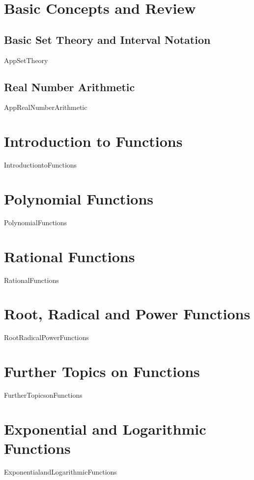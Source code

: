 \documentclass[11pt]{book}
\theoremstyle{definition}  %
\begin{document}
\renewcommand{\chaptername}{Chapter}

\chapter{Basic Concepts and Review}
\thispagestyle{empty}
\section{Basic Set Theory and Interval Notation}
{AppSetTheory}
\newpage
\section{Real Number Arithmetic}
{AppRealNumberArithmetic}

\chapter{Introduction to Functions}
\label{IntroductiontoFunctions}
\thispagestyle{empty}
{IntroductiontoFunctions}

\chapter{Polynomial Functions}
\label{PolynomialFunctions}
\thispagestyle{empty}
{PolynomialFunctions}

\chapter{Rational Functions}
\label{RationalFunctions}
\thispagestyle{empty}
{RationalFunctions}


\chapter{Root, Radical and Power Functions}
\label{RootRadicalPowerFunctions}
\thispagestyle{empty}
{RootRadicalPowerFunctions}

\chapter{Further Topics on Functions}
\label{FurtherTopicsonFunctions}
\thispagestyle{empty}
{FurtherTopicsonFunctions}

\chapter{Exponential and Logarithmic Functions}
\label{ExponentialandLogarithmicFunctions}
\thispagestyle{empty}
{ExponentialandLogarithmicFunctions}
\end{document}
